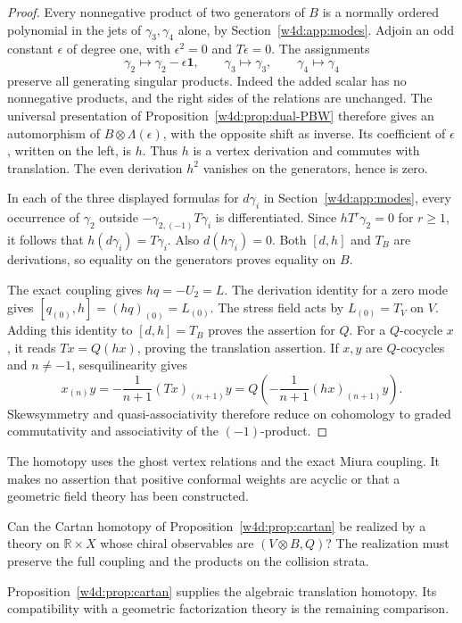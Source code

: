 \begin{proof}
Every nonnegative product of two generators of $B$ is a normally
ordered polynomial in the jets of $\gamma_3,\gamma_4$ alone, by
Section~\ref{w4d:app:modes}. Adjoin an odd constant $\epsilon$ of
degree one, with $\epsilon^2=0$ and $T\epsilon=0$. The assignments
\[
 \gamma_2\longmapsto\gamma_2-\epsilon\mathbf1,
 \qquad\gamma_3\longmapsto\gamma_3,
 \qquad\gamma_4\longmapsto\gamma_4
\]
preserve all generating singular products. Indeed the added scalar
has no nonnegative products, and the right sides of the relations
are unchanged. The universal presentation of
Proposition~\ref{w4d:prop:dual-PBW} therefore gives an automorphism
of $B\otimes\Lambda(\epsilon)$, with the opposite shift as inverse.
Its coefficient of $\epsilon$, written on the left, is $h$.
Thus $h$ is a vertex derivation and commutes with translation.
The even derivation $h^2$ vanishes on the generators, hence is zero.

In each of the three displayed formulas for $d\gamma_i$ in
Section~\ref{w4d:app:modes}, every occurrence of $\gamma_2$ outside
$-\gamma_{2,(-1)}T\gamma_i$ is differentiated. Since
$hT^r\gamma_2=0$ for $r\geq1$, it follows that
$h(d\gamma_i)=T\gamma_i$. Also $d(h\gamma_i)=0$.
Both $[d,h]$ and $T_B$ are derivations, so equality on the
generators proves equality on $B$.

The exact coupling gives $hq=-U_2=L$.
The derivation identity for a zero mode gives
$[q_{(0)},h]=(hq)_{(0)}=L_{(0)}$.
The stress field acts by $L_{(0)}=T_V$ on $V$.
Adding this identity to $[d,h]=T_B$ proves the assertion for $Q$.
For a $Q$-cocycle $x$, it reads $Tx=Q(hx)$, proving the
translation assertion. If $x,y$ are $Q$-cocycles and $n\ne-1$,
sesquilinearity gives
\[
 x_{(n)}y=-\frac{1}{n+1}(Tx)_{(n+1)}y
       =Q\!\left(-\frac{1}{n+1}(hx)_{(n+1)}y\right).
\]
Skewsymmetry and quasi-associativity therefore reduce on cohomology
to graded commutativity and associativity of the $(-1)$-product.
\end{proof}

The homotopy uses the ghost vertex relations and the exact Miura
coupling. It makes no assertion that positive conformal weights
are acyclic or that a geometric field theory has been constructed.

\begin{question}\label{w4d:qn:topologization}
Can the Cartan homotopy of Proposition~\ref{w4d:prop:cartan}
be realized by a theory on $\mathbb R\times X$ whose chiral
observables are $(V\otimes B,Q)$? The realization must preserve
the full coupling and the products on the collision strata.
\end{question}
Proposition~\ref{w4d:prop:cartan} supplies the algebraic translation
homotopy. Its compatibility with a geometric factorization theory
is the remaining comparison.

